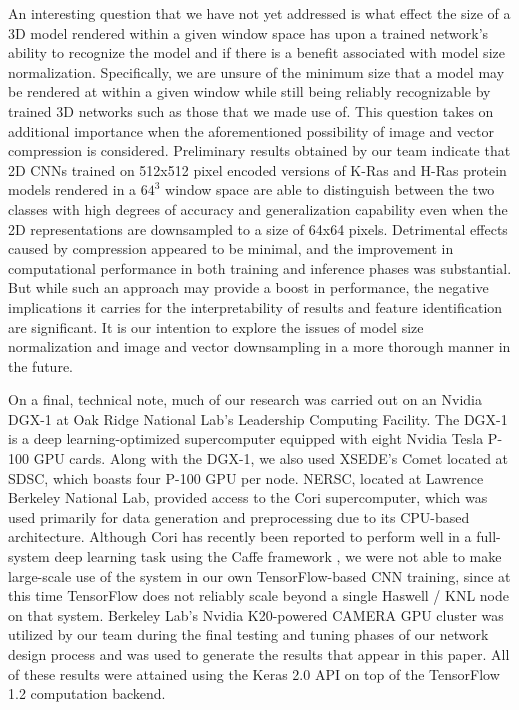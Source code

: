\documentclass{article}
\begin{document}
An interesting question that we have not yet addressed is what effect the size of a 3D model rendered within a given window space has upon a trained network's ability to recognize the model and if there is a benefit associated with model size normalization. Specifically, we are unsure of the minimum size that a model may be rendered at within a given window while still being reliably recognizable by trained 3D networks such as those that we made use of. This question takes on additional importance when the aforementioned possibility of image and vector compression is considered. Preliminary results obtained by our team indicate that 2D CNNs trained on 512x512 pixel encoded versions of K-Ras and H-Ras protein models rendered in a $64^3$ window space are able to distinguish between the two classes with high degrees of accuracy and generalization capability even when the 2D representations are downsampled to a size of 64x64 pixels. Detrimental effects caused by compression appeared to be minimal, and the improvement in computational performance in both training and inference phases was substantial. But while such an approach may provide a boost in performance, the negative implications it carries for the interpretability of results and feature identification are significant. It is our intention to explore the issues of model size normalization and image and vector downsampling in a more thorough manner in the future.  

On a final, technical note, much of our research was carried out on an Nvidia DGX-1 at Oak Ridge National Lab's Leadership Computing Facility. The DGX-1 is a deep learning-optimized supercomputer equipped with eight Nvidia Tesla P-100 GPU cards. Along with the DGX-1, we also used XSEDE's Comet located at SDSC, which boasts four P-100 GPU per node. NERSC, located at Lawrence Berkeley National Lab, provided access to the Cori supercomputer, which was used primarily for data generation and preprocessing due to its CPU-based architecture. Although Cori has recently been reported to perform well in a full-system deep learning task using the Caffe framework \cite{2017arXiv170805256K}, we were not able to make large-scale use of the system in our own TensorFlow-based CNN training, since at this time TensorFlow does not reliably scale beyond a single Haswell / KNL node on that system. Berkeley Lab's Nvidia K20-powered CAMERA GPU cluster was utilized by our team during the final testing and tuning phases of our network design process and was used to generate the results that appear in this paper. All of these results were attained using the Keras 2.0 API on top of the TensorFlow 1.2 computation backend. 
\end{document}
